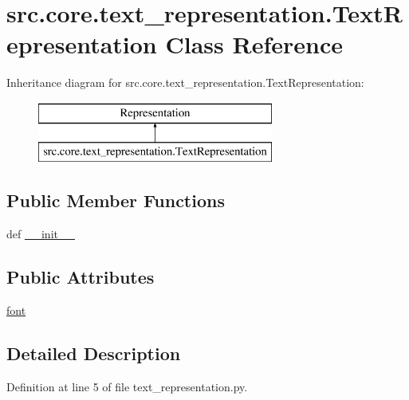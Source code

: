 \hypertarget{classsrc_1_1core_1_1text__representation_1_1_text_representation}{\section{src.\+core.\+text\+\_\+representation.\+Text\+Representation Class Reference}
\label{classsrc_1_1core_1_1text__representation_1_1_text_representation}
}
Inheritance diagram for src.\+core.\+text\+\_\+representation.\+Text\+Representation\+:\begin{figure}[H]
\begin{center}
\leavevmode
\includegraphics[height=2.000000cm]{classsrc_1_1core_1_1text__representation_1_1_text_representation}
\end{center}
\end{figure}
\subsection*{Public Member Functions}
\begin{DoxyCompactItemize}
\item 
def \hyperlink{classsrc_1_1core_1_1text__representation_1_1_text_representation_a4e022375d60b50b1b84aac1083650c4b}{\+\_\+\+\_\+init\+\_\+\+\_\+}
\end{DoxyCompactItemize}
\subsection*{Public Attributes}
\begin{DoxyCompactItemize}
\item 
\hyperlink{classsrc_1_1core_1_1text__representation_1_1_text_representation_aeb2f021498890dec4d8daff88cf704b8}{font}
\end{DoxyCompactItemize}


\subsection{Detailed Description}


Definition at line 5 of file text\+\_\+representation.\+py.



